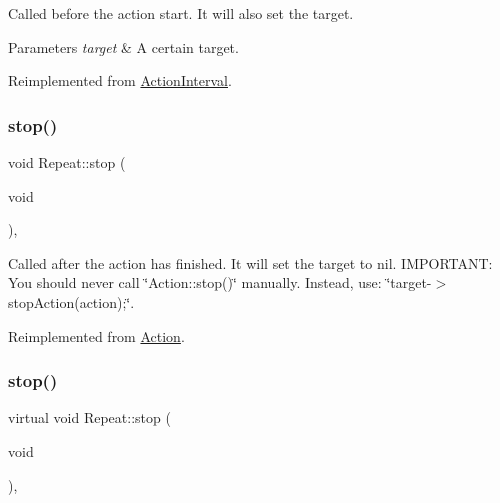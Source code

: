 Called before the action start. It will also set the target.


\begin{DoxyParams}{Parameters}
{\em target} & A certain target. \\
\hline
\end{DoxyParams}


Reimplemented from \hyperlink{classActionInterval_ad3d91186b2c3108488ddbbdbbd982484}{Action\+Interval}.

\mbox{\label{classRepeat_ae7d7d020a49dbbe3ee160fe22db02ad2}} 
\subsubsection{\texorpdfstring{stop()}{stop()}\hspace{0.1cm}{\footnotesize\ttfamily [1/2]}}
{\footnotesize\ttfamily void Repeat\+::stop (\begin{DoxyParamCaption}\item[{void}]{ }\end{DoxyParamCaption})\hspace{0.3cm}{\ttfamily [override]}, {\ttfamily [virtual]}}

Called after the action has finished. It will set the \textquotesingle{}target\textquotesingle{} to nil. I\+M\+P\+O\+R\+T\+A\+NT\+: You should never call \char`\"{}\+Action\+::stop()\char`\"{} manually. Instead, use\+: \char`\"{}target-\/$>$stop\+Action(action);\char`\"{}. 

Reimplemented from \hyperlink{classAction_a968267fa7a1dcc46a2976249a712d3c8}{Action}.

\mbox{\label{classRepeat_a53b3a08574698685425cd7c55645e57a}} 
\subsubsection{\texorpdfstring{stop()}{stop()}\hspace{0.1cm}{\footnotesize\ttfamily [2/2]}}
{\footnotesize\ttfamily virtual void Repeat\+::stop (\begin{DoxyParamCaption}\item[{void}]{ }\end{DoxyParamCaption})\hspace{0.3cm}{\ttfamily [override]}, {\ttfamily [virtual]}}

